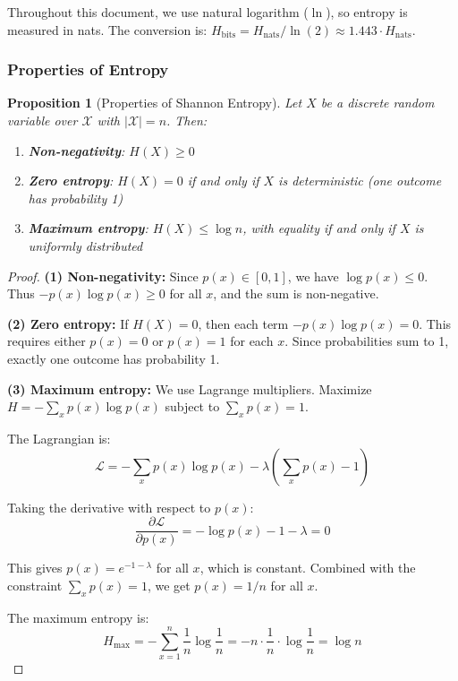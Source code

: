 \documentclass[11pt,a4paper]{article}
\theoremstyle{definition}
\theoremstyle{plain}
\newtheorem{proposition}{Proposition}[section]
\begin{document}
Throughout this document, we use natural logarithm ($\ln$), so entropy is measured in nats. The conversion is: $H_{\text{bits}} = H_{\text{nats}} / \ln(2) \approx 1.443 \cdot H_{\text{nats}}$.

\subsubsection{Properties of Entropy}

\begin{proposition}[Properties of Shannon Entropy]
Let $X$ be a discrete random variable over $\mathcal{X}$ with $|\mathcal{X}| = n$. Then:
\begin{enumerate}
    \item \textbf{Non-negativity}: $H(X) \geq 0$
    \item \textbf{Zero entropy}: $H(X) = 0$ if and only if $X$ is deterministic (one outcome has probability 1)
    \item \textbf{Maximum entropy}: $H(X) \leq \log n$, with equality if and only if $X$ is uniformly distributed
\end{enumerate}
\end{proposition}

\begin{proof}
\textbf{(1) Non-negativity:} Since $p(x) \in [0,1]$, we have $\log p(x) \leq 0$. Thus $-p(x) \log p(x) \geq 0$ for all $x$, and the sum is non-negative.

\textbf{(2) Zero entropy:} If $H(X) = 0$, then each term $-p(x) \log p(x) = 0$. This requires either $p(x) = 0$ or $p(x) = 1$ for each $x$. Since probabilities sum to 1, exactly one outcome has probability 1.

\textbf{(3) Maximum entropy:} We use Lagrange multipliers. Maximize $H = -\sum_x p(x) \log p(x)$ subject to $\sum_x p(x) = 1$.

The Lagrangian is:
\[
\mathcal{L} = -\sum_x p(x) \log p(x) - \lambda \left(\sum_x p(x) - 1\right)
\]

Taking the derivative with respect to $p(x)$:
\[
\frac{\partial \mathcal{L}}{\partial p(x)} = -\log p(x) - 1 - \lambda = 0
\]

This gives $p(x) = e^{-1-\lambda}$ for all $x$, which is constant. Combined with the constraint $\sum_x p(x) = 1$, we get $p(x) = 1/n$ for all $x$.

The maximum entropy is:
\[
H_{\max} = -\sum_{x=1}^{n} \frac{1}{n} \log \frac{1}{n} = -n \cdot \frac{1}{n} \cdot \log \frac{1}{n} = \log n
\]
\end{proof}
\end{document}
